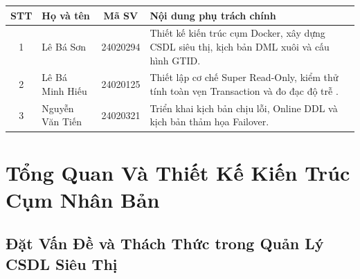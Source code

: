 \documentclass[12pt,a4paper]{report}
\begin{document}
\begin{table}[h!]
\centering
\begin{tabular}{|c|l|c|p{7.5cm}|}
\hline
\textbf{STT} & \textbf{Họ và tên} & \textbf{Mã SV} & \textbf{Nội dung phụ trách chính} \\ \hline
1 & Lê Bá Sơn & 24020294 & Thiết kế kiến trúc cụm Docker, xây dựng CSDL siêu thị, kịch bản DML xuôi và cấu hình GTID. \\ \hline
2 & Lê Bá Minh Hiếu & 24020125 & Thiết lập cơ chế Super Read-Only, kiểm thử tính toàn vẹn Transaction và đo đạc độ trễ . \\ \hline
3 & Nguyễn Văn Tiến & 24020321 & Triển khai kịch bản chịu lỗi, Online DDL và kịch bản thảm họa Failover. \\ \hline
\end{tabular}
\end{table}

\newpage

\tableofcontents
\newpage
\newpage


\chapter{Tổng Quan Và Thiết Kế Kiến Trúc Cụm Nhân Bản}

\section{Đặt Vấn Đề và Thách Thức trong Quản Lý CSDL Siêu Thị}
\end{document}
